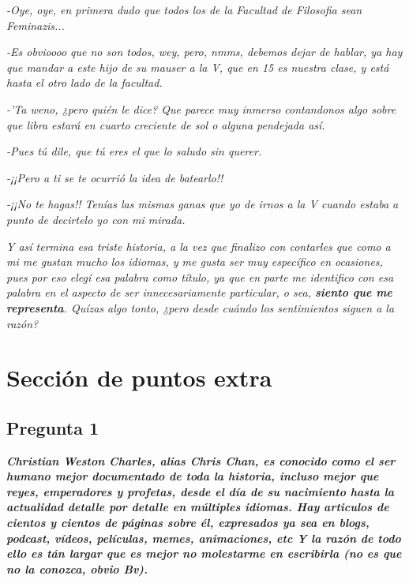 \documentclass[12pt,letterpaper]{article}
\begin{document}
{\small{\textit{-Oye, oye, en primera dudo que todos los de la Facultad de Filosofia sean Feminazis...\\}}}

{\small{\textit{-Es obvioooo que no son todos, wey, pero, nmms, debemos dejar de hablar, ya hay que mandar a este hijo de su mauser a la V, que en 15 es nuestra clase, y está hasta el otro lado de la facultad.\\}}}

{\small{\textit{-'Ta weno, ¿pero quién le dice? Que parece muy inmerso contandonos algo sobre que libra estará en cuarto creciente de sol o alguna pendejada así.\\}}}

{\small{\textit{-Pues tú dile, que tú eres el que lo saludo sin querer.\\}}}

{\small{\textit{-¡¡Pero a ti se te ocurrió la idea de batearlo!!\\}}}

{\small{\textit{-¡¡No te hagas!! Tenías las mismas ganas que yo de irnos a la V cuando estaba a punto de decirtelo yo con mi mirada.\\}}}

{\small{\textit{Y así termina esa triste historia, a la vez que finalizo con contarles que como a mi me gustan mucho los idiomas, y me gusta ser muy específico en ocasiones, pues por eso elegí esa palabra como título, ya que en parte me identifico con esa palabra en el aspecto de ser innecesariamente particular, o sea, {\large{\textbf{siento que me representa}}}. Quízas algo tonto, ¿pero desde cuándo los sentimientos siguen a la razón?}}}

\section{\Huge{\textbf{Sección de puntos extra}}}

    \subsection{\huge{Pregunta 1}}

{\textit{\textbf{Christian Weston Charles, alias Chris Chan, es conocido como el ser humano mejor documentado de toda la historia, incluso mejor que reyes, emperadores y profetas, desde el día de su nacimiento hasta la actualidad detalle por detalle en múltiples idiomas. Hay articulos de cientos y cientos de páginas sobre él, expresados ya sea en blogs, podcast, vídeos, películas, memes, animaciones, etc Y la razón de todo ello es tán largar que es mejor no molestarme en escribirla (no es que no la conozca, obvio Bv).\\}}}
\end{document}
